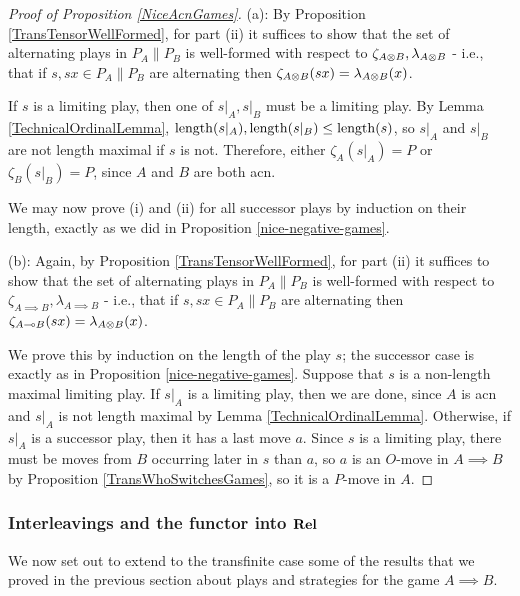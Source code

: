 \documentclass[11pt]{article} %
\begin{document}
\begin{proof}[Proof of Proposition \ref{NiceAcnGames}]
  (a): By Proposition \ref{TransTensorWellFormed}, for part (ii) it suffices to show that the set of alternating plays in $P_A\|P_B$ is well-formed with respect to $\zeta_{A\otimes B},\lambda_{A\otimes B}$ - i.e., that if $s,sx\in P_A\|P_B$ are alternating then $\zeta_{A\otimes B}(sx)=\lambda_{A\otimes B}(x)$.

  If $s$ is a limiting play, then one of $s\vert_A,s\vert_B$ must be a limiting play.  By Lemma \ref{TechnicalOrdinalLemma}, $\operatorname{length}(s\vert_A),\operatorname{length}(s\vert_B)\le\operatorname{length}(s)$, so $s\vert_A$ and $s\vert_B$ are not length maximal if $s$ is not.  Therefore, either $\zeta_A(s\vert_A)=P$ or $\zeta_B(s\vert_B)=P$, since $A$ and $B$ are both acn.  

  We may now prove (i) and (ii) for all successor plays by induction on their length, exactly as we did in Proposition \ref{nice-negative-games}.  

  (b): Again, by Proposition \ref{TransTensorWellFormed}, for part (ii) it suffices to show that the set of alternating plays in $P_A\|P_B$ is well-formed with respect to $\zeta_{A\implies B},\lambda_{A\implies B}$ - i.e., that if $s,sx\in P_A\|P_B$ are alternating then $\zeta_{A\multimap B}(sx)=\lambda_{A\otimes B}(x)$.  

  We prove this by induction on the length of the play $s$; the successor case is exactly as in Proposition \ref{nice-negative-games}.  Suppose that $s$ is a non-length maximal limiting play.  If $s\vert_A$ is a limiting play, then we are done, since $A$ is acn and $s\vert_A$ is not length maximal by Lemma \ref{TechnicalOrdinalLemma}.  Otherwise, if $s\vert_A$ is a successor play, then it has a last move $a$.  Since $s$ is a limiting play, there must be moves from $B$ occurring later in $s$ than $a$, so $a$ is an $O$-move in $A\implies B$ by Proposition \ref{TransWhoSwitchesGames}, so it is a $P$-move in $A$.
\end{proof}

\subsubsection{Interleavings and the functor into ${\normalfont\textbf{Rel}}$}

We now set out to extend to the transfinite case some of the results that we proved in the previous section about plays and strategies for the game $A\implies B$.
\end{document}
